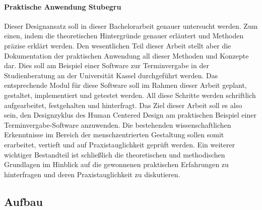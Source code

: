 \paragraph{Praktische Anwendung Stubegru}
Dieser Designansatz soll in dieser Bachelorarbeit genauer untersucht werden.
Zum einen, indem die theoretischen Hintergründe genauer erläutert und Methoden
präzise erklärt werden. Den wesentlichen Teil dieser Arbeit stellt aber die
Dokumentation der praktischen Anwendung all dieser Methoden und Konzepte dar.
Dies soll am Beispiel einer Software zur Terminvergabe in der Studienberatung
an der Universität Kassel durchgeführt werden. Das entsprechende Modul für
diese Software soll im Rahmen dieser Arbeit geplant, gestaltet, implementiert
und getestet werden. All diese Schritte werden schriftlich aufgearbeitet,
festgehalten und hinterfragt. Das Ziel dieser Arbeit soll es also sein, den
Designzyklus des Human Centered Design am praktischen Beispiel einer
Terminvergabe-Software anzuwenden. Die bestehenden wissenschaftlichen
Erkenntnisse im Bereich der menschzentrierten Gestaltung sollen somit
erarbeitet, vertieft und auf Praxistauglichkeit geprüft werden. Ein weiterer
wichtiger Bestandteil ist schließlich die theoretischen und methodischen
Grundlagen im Hinblick auf die gewonnenen praktischen Erfahrungen zu
hinterfragen und deren Praxistauglichkeit zu diskutieren.

\subsection{Aufbau}

